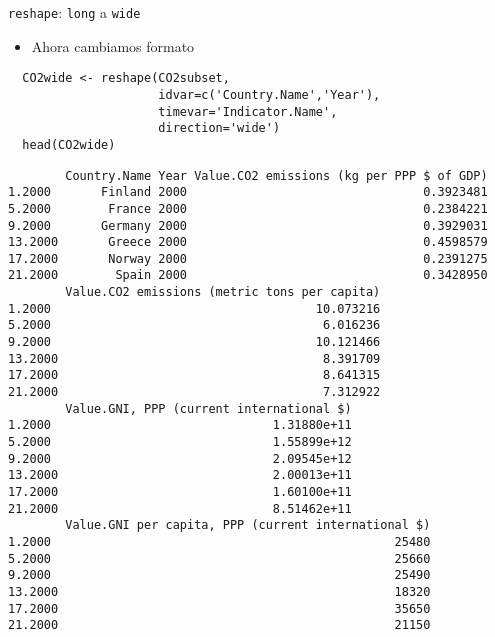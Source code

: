 \documentclass[xcolor={usenames,svgnames,dvipsnames}]{beamer}
\begin{document}
\begin{frame}[fragile,label=sec-4-6]{\texttt{reshape}: \texttt{long} a \texttt{wide}}
 \begin{itemize}
\item Ahora cambiamos formato
\end{itemize}
\lstset{language=R,label= ,caption= ,numbers=none}
\begin{lstlisting}
  CO2wide <- reshape(CO2subset,
                     idvar=c('Country.Name','Year'),
                     timevar='Indicator.Name',
                     direction='wide')
  head(CO2wide)
\end{lstlisting}

\begin{verbatim}
        Country.Name Year Value.CO2 emissions (kg per PPP $ of GDP)
1.2000       Finland 2000                                 0.3923481
5.2000        France 2000                                 0.2384221
9.2000       Germany 2000                                 0.3929031
13.2000       Greece 2000                                 0.4598579
17.2000       Norway 2000                                 0.2391275
21.2000        Spain 2000                                 0.3428950
        Value.CO2 emissions (metric tons per capita)
1.2000                                     10.073216
5.2000                                      6.016236
9.2000                                     10.121466
13.2000                                     8.391709
17.2000                                     8.641315
21.2000                                     7.312922
        Value.GNI, PPP (current international $)
1.2000                               1.31880e+11
5.2000                               1.55899e+12
9.2000                               2.09545e+12
13.2000                              2.00013e+11
17.2000                              1.60100e+11
21.2000                              8.51462e+11
        Value.GNI per capita, PPP (current international $)
1.2000                                                25480
5.2000                                                25660
9.2000                                                25490
13.2000                                               18320
17.2000                                               35650
21.2000                                               21150
\end{verbatim}
\end{frame}
\end{document}

